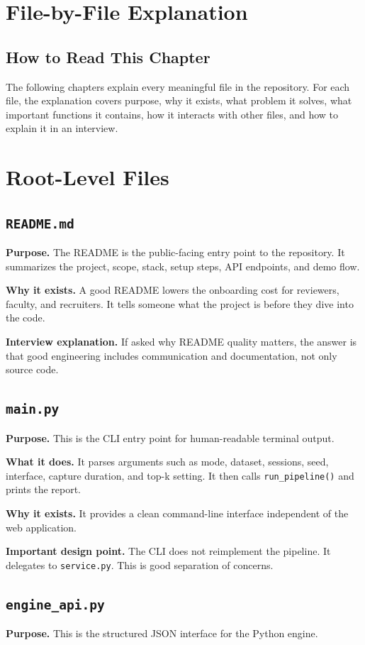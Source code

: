 \documentclass[12pt,a4paper]{report}
\begin{document}
\chapter{File-by-File Explanation}
\section{How to Read This Chapter}
The following chapters explain every meaningful file in the repository. For each file, the explanation covers purpose, why it exists, what problem it solves, what important functions it contains, how it interacts with other files, and how to explain it in an interview.

\chapter{Root-Level Files}
\section{\texttt{README.md}}
\textbf{Purpose.} The README is the public-facing entry point to the repository. It summarizes the project, scope, stack, setup steps, API endpoints, and demo flow.

\textbf{Why it exists.} A good README lowers the onboarding cost for reviewers, faculty, and recruiters. It tells someone what the project is before they dive into the code.

\textbf{Interview explanation.} If asked why README quality matters, the answer is that good engineering includes communication and documentation, not only source code.

\section{\texttt{main.py}}
\textbf{Purpose.} This is the CLI entry point for human-readable terminal output.

\textbf{What it does.} It parses arguments such as mode, dataset, sessions, seed, interface, capture duration, and top-k setting. It then calls \texttt{run\_pipeline()} and prints the report.

\textbf{Why it exists.} It provides a clean command-line interface independent of the web application.

\textbf{Important design point.} The CLI does not reimplement the pipeline. It delegates to \texttt{service.py}. This is good separation of concerns.

\section{\texttt{engine\_api.py}}
\textbf{Purpose.} This is the structured JSON interface for the Python engine.
\end{document}
